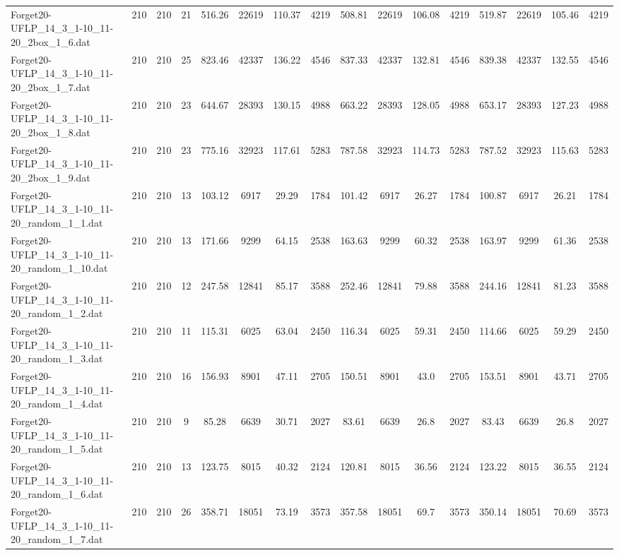 \begin{sidewaystable}[!ht]
{\begin{tabular}{lccccccccccccccc}
Forget20-UFLP\_14\_3\_1-10\_11-20\_2box\_1\_6.dat & 210 & 210 & 21 & 516.26 & 22619 & 110.37 & 4219 & 508.81 & 22619 & 106.08 & 4219 & 519.87 & 22619 & 105.46 & 4219 \\
Forget20-UFLP\_14\_3\_1-10\_11-20\_2box\_1\_7.dat & 210 & 210 & 25 & 823.46 & 42337 & 136.22 & 4546 & 837.33 & 42337 & 132.81 & 4546 & 839.38 & 42337 & 132.55 & 4546 \\
Forget20-UFLP\_14\_3\_1-10\_11-20\_2box\_1\_8.dat & 210 & 210 & 23 & 644.67 & 28393 & 130.15 & 4988 & 663.22 & 28393 & 128.05 & 4988 & 653.17 & 28393 & 127.23 & 4988 \\
Forget20-UFLP\_14\_3\_1-10\_11-20\_2box\_1\_9.dat & 210 & 210 & 23 & 775.16 & 32923 & 117.61 & 5283 & 787.58 & 32923 & 114.73 & 5283 & 787.52 & 32923 & 115.63 & 5283 \\
Forget20-UFLP\_14\_3\_1-10\_11-20\_random\_1\_1.dat & 210 & 210 & 13 & 103.12 & 6917 & 29.29 & 1784 & 101.42 & 6917 & 26.27 & 1784 & 100.87 & 6917 &  \textcolor{blue2}{26.21} & 1784 \\
Forget20-UFLP\_14\_3\_1-10\_11-20\_random\_1\_10.dat & 210 & 210 & 13 & 171.66 & 9299 & 64.15 & 2538 & 163.63 & 9299 &  \textcolor{blue2}{60.32} & 2538 & 163.97 & 9299 & 61.36 & 2538 \\
Forget20-UFLP\_14\_3\_1-10\_11-20\_random\_1\_2.dat & 210 & 210 & 12 & 247.58 & 12841 & 85.17 & 3588 & 252.46 & 12841 & 79.88 & 3588 & 244.16 & 12841 & 81.23 & 3588 \\
Forget20-UFLP\_14\_3\_1-10\_11-20\_random\_1\_3.dat & 210 & 210 & 11 & 115.31 & 6025 & 63.04 & 2450 & 116.34 & 6025 & 59.31 & 2450 & 114.66 & 6025 &  \textcolor{blue2}{59.29} & 2450 \\
Forget20-UFLP\_14\_3\_1-10\_11-20\_random\_1\_4.dat & 210 & 210 & 16 & 156.93 & 8901 & 47.11 & 2705 & 150.51 & 8901 &  \textcolor{blue2}{43.0} & 2705 & 153.51 & 8901 & 43.71 & 2705 \\
Forget20-UFLP\_14\_3\_1-10\_11-20\_random\_1\_5.dat & 210 & 210 & 9 & 85.28 & 6639 & 30.71 & 2027 & 83.61 & 6639 &  \textcolor{blue2}{26.8} & 2027 & 83.43 & 6639 &  \textcolor{blue2}{26.8} & 2027 \\
Forget20-UFLP\_14\_3\_1-10\_11-20\_random\_1\_6.dat & 210 & 210 & 13 & 123.75 & 8015 & 40.32 & 2124 & 120.81 & 8015 & 36.56 & 2124 & 123.22 & 8015 &  \textcolor{blue2}{36.55} & 2124 \\
Forget20-UFLP\_14\_3\_1-10\_11-20\_random\_1\_7.dat & 210 & 210 & 26 & 358.71 & 18051 & 73.19 & 3573 & 357.58 & 18051 &  \textcolor{blue2}{69.7} & 3573 & 350.14 & 18051 & 70.69 & 3573 \\

\end{tabular}}
\end{sidewaystable}
